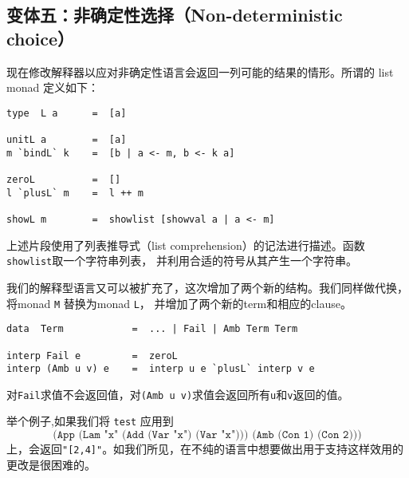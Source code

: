 \documentclass[12pt]{article}
\begin{document}
\vspace{-0.2em}
\subsection{变体五：非确定性选择（Non-deterministic choice）}
\noindent{}现在修改解释器以应对非确定性语言会返回一列可能的结果的情形。所谓的 list monad 定义如下：
\begin{verbatim}
type  L a      =  [a]

unitL a        =  [a]
m `bindL` k    =  [b | a <- m, b <- k a]

zeroL          =  []
l `plusL` m    =  l ++ m

showL m        =  showlist [showval a | a <- m]
\end{verbatim}
\noindent{}上述片段使用了列表推导式（list comprehension）的记法进行描述。函数\texttt{showlist}取一个字符串列表，
并利用合适的符号从其产生一个字符串。

\indent{}我们的解释型语言又可以被扩充了，这次增加了两个新的结构。我们同样做代换，将monad \texttt{M} 替换为monad \texttt{L}，
并增加了两个新的term和相应的clause。
\begin{verbatim}
data  Term            =  ... | Fail | Amb Term Term

interp Fail e         =  zeroL
interp (Amb u v) e    =  interp u e `plusL` interp v e
\end{verbatim}
\noindent{}对\texttt{Fail}求值不会返回值，对\texttt{(Amb u v)}求值会返回所有\texttt{u}和\texttt{v}返回的值。

\indent{}举个例子,如果我们将 \texttt{test} 应用到
\begin{displaymath}
\texttt{(App (Lam "x" (Add (Var "x") (Var "x"))) (Amb (Con 1) (Con 2)))}
\end{displaymath}
上，会返回\texttt{"[2,4]"}。如我们所见，在不纯的语言中想要做出用于支持这样效用的更改是很困难的。
\end{document}
